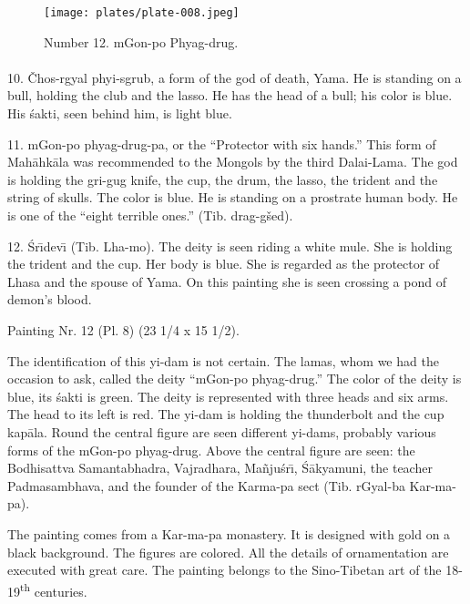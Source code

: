 \documentclass[a4paper, 12pt, oneside]{article}
\begin{document}
\clearpage
\vspace*{\fill}
\begin{figure}[H]
\centering
\texttt{[image: plates/plate-008.jpeg]}
\caption*{Number 12. mGon-po Phyag-drug.}
\end{figure}
\vspace*{\fill}
\clearpage
\paragraph{}
10. Čhos-rgyal phyi-sgrub, a form of the god of death, Yama. He is standing on a bull, holding the club and the lasso. He has the head of a bull; his color is blue. His \'{s}akti, seen behind him, is light blue.

11. mGon-po phyag-drug-pa, or the ``Protector with six hands.'' This form of Mah\={a}hk\={a}la was recommended to the Mongols by the third Dalai-Lama. The god is holding the gri-gug knife, the cup, the drum, the lasso, the trident and the string of skulls. The color is blue. He is standing on a prostrate human body. He is one of the ``eight terrible ones.'' (Tib. drag-gšed).

12. \'{S}r\={\i}dev\={\i} (Tib. Lha-mo). The deity is seen riding a white mule. She is holding the trident and the cup. Her body is blue. She is regarded as the protector of Lhasa and the spouse of Yama. On this painting she is seen crossing a pond of demon's blood.

\bigskip

Painting Nr. 12 (Pl. 8) (23 1/4 x 15 1/2).

\bigskip

The identification of this yi-dam is not certain. The lamas, whom we had the occasion to ask, called the deity ``mGon-po phyag-drug.'' The color of the deity is blue, its \'{s}akti is green. The deity is represented with three heads and six arms. The head to its left is red. The yi-dam is holding the thunderbolt and the cup kap\={a}la. Round the central figure are seen different yi-dams, probably various forms of the mGon-po phyag-drug. Above the central figure are seen: the Bodhisattva Samantabhadra, Vajradhara, Ma\~{n}ju\'{s}r\={\i}, \'{S}\={a}kyamuni, the teacher Padmasambhava, and the founder of the Karma-pa sect (Tib. rGyal-ba Kar-ma-pa).

The painting comes from a Kar-ma-pa monastery. It is designed with gold on a black background. The figures are colored. All the details of ornamentation are executed with great care. The painting belongs to the Sino-Tibetan art of the 18-19\textsuperscript{th} centuries.
\end{document}
